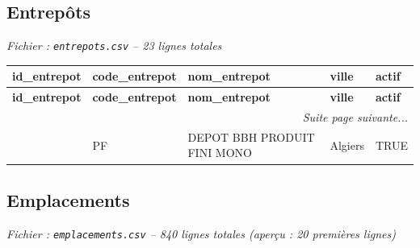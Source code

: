 \documentclass[a4paper,11pt]{article}
\begin{document}
\newpage

\subsection{Entrepôts}

\textit{Fichier : \texttt{entrepots.csv} -- 23 lignes totales
}


\scriptsize
\begin{longtable}{|l|l|l|l|l|}
\hline
\rowcolor{headerblue}
\textbf{id\_entrepot} & \textbf{code\_entrepot} & \textbf{nom\_entrepot} & \textbf{ville} & \textbf{actif} \\ \hline
\endfirsthead
\hline
\rowcolor{headerblue}
\textbf{id\_entrepot} & \textbf{code\_entrepot} & \textbf{nom\_entrepot} & \textbf{ville} & \textbf{actif} \\ \hline
\endhead
\hline \multicolumn{5}{|r|}{\textit{Suite page suivante...}} \\ \hline
\endfoot
\hline
\endlastfoot
 235 & PF & DEPOT BBH PRODUIT FINI MONO & Algiers & TRUE \\ \hline
\end{longtable}
\normalsize

\newpage

\subsection{Emplacements}

\textit{Fichier : \texttt{emplacements.csv} -- 840 lignes totales
 (aperçu : 20 premières lignes)
}
\end{document}
